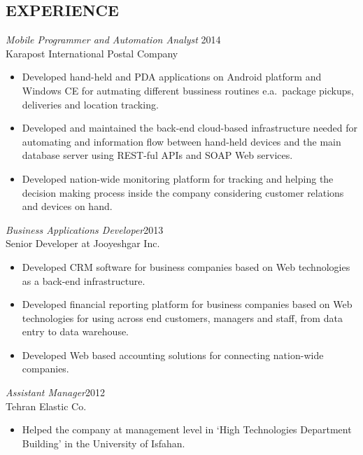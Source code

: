 \documentclass[margin, 10pt]{res} %
\begin{document}
\begin{resume}
 
\section{EXPERIENCE}

{\sl Mobile Programmer and Automation Analyst} \hfill 2014 \\
Karapost International Postal Company

\begin{itemize} \itemsep -2pt %
\item Developed hand-held and PDA applications on Android platform and Windows CE for autmating different bussiness
  routines e.a.\ package pickups, deliveries and location tracking.
\item Developed and maintained the back-end cloud-based infrastructure needed for automating and information flow between
  hand-held devices and the main database server using REST-ful APIs and SOAP Web services.
\item Developed nation-wide monitoring platform for tracking and helping the
  decision making process inside the company considering customer relations and devices on hand.
\end{itemize}
 
{\sl Business Applications Developer}\hfill 2013 \\
Senior Developer at Jooyeshgar Inc.
\begin{itemize} 
\item Developed CRM software for business companies based on Web technologies as a back-end infrastructure.
\item Developed financial reporting platform for business companies based on Web
  technologies for using across end customers, managers and staff, from data entry
  to data warehouse.
\item Developed Web based accounting solutions for connecting nation-wide companies.
\end{itemize} 

{\sl Assistant Manager}\hfill 2012 \\
Tehran Elastic Co.
\begin{itemize}
\item Helped the company at management level in `High Technologies Department
  Building' in the University of Isfahan.
\end{itemize} 


\end{resume}
\end{document}

